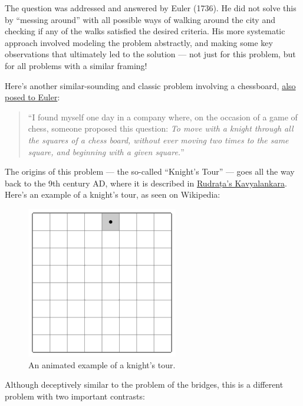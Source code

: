 \documentclass[
  letterpaper,
  DIV=11,
  numbers=noendperiod]{scrreprt}
\begin{document}
The question was addressed and answered by Euler (1736). He did not
solve this by ``messing around'' with all possible ways of walking
around the city and checking if any of the walks satisfied the desired
criteria. His more systematic approach involved modeling the problem
abstractly, and making some key observations that ultimately led to the
solution --- not just for this problem, but for all problems with a
similar framing!

Here's another similar-sounding and classic problem involving a
chessboard,
\href{https://en.chessbase.com/post/euler-and-the-knights-tour}{also
posed to Euler}:

\begin{quote}
``I found myself one day in a company where, on the occasion of a game
of chess, someone proposed this question: \emph{To move with a knight
through all the squares of a chess board, without ever moving two times
to the same square, and beginning with a given square.}''
\end{quote}

The origins of this problem --- the so-called ``Knight's Tour'' --- goes
all the way back to the 9th century AD, where it is described in
\href{https://www.ias.ac.in/article/fulltext/reso/025/08/1095-1116}{Rudraṭa's
Kavyalankara}. Here's an example of a knight's tour, as seen on
Wikipedia:

\begin{figure}

{\centering \includegraphics{./figures/ch3-kt-anim.gif}

}

\caption{An animated example of a knight's tour.}

\end{figure}

Although deceptively similar to the problem of the bridges, this is a
different problem with two important contrasts:
\end{document}
